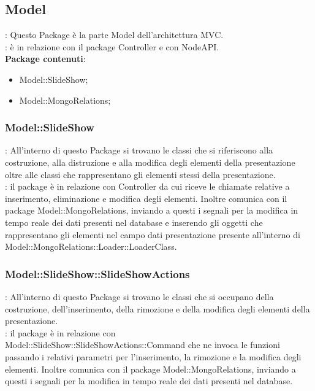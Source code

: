 \subsection{Model}{
	\textbf{\tipo}: Questo Package è la parte Model dell'architettura MVC.\\
	\textbf{\relaz}: è in relazione con il package Controller e con NodeAPI.\\
	\textbf{Package contenuti}: 
	\begin{itemize}
	\item Model::SlideShow;
    \item Model::MongoRelations;
	\end{itemize}
}
\subsubsection{Model::SlideShow}{
		\textbf{\tipo}: All’interno di questo Package si trovano le classi che si riferiscono alla costruzione, alla distruzione e alla modifica degli elementi della presentazione oltre alle classi che rappresentano gli elementi stessi della presentazione.\\
        \textbf{\relaz}: il package è in relazione con Controller da cui riceve le chiamate relative a inserimento, eliminazione e modifica degli elementi. Inoltre comunica con il package Model::MongoRelations, inviando a questi i segnali per la modifica in tempo reale dei dati presenti nel database e inserendo gli oggetti che rappresentano gli elementi nel campo dati presentazione presente all'interno di Model::MongoRelations::Loader::LoaderClass.\\
    }
\subsubsection{Model::SlideShow::SlideShowActions}{
		\textbf{\tipo}: All’interno di questo Package si trovano le classi che si occupano della costruzione, dell'inserimento, della rimozione e della modifica degli elementi della presentazione.\\
        \textbf{\relaz}: il package è in relazione con\\ Model::SlideShow::SlideShowActions::Command che ne invoca le funzioni passando i relativi parametri per l'inserimento, la rimozione e la modifica degli elementi. Inoltre comunica con il package Model::MongoRelations, inviando a questi i segnali per la modifica in tempo reale dei dati presenti nel database.\\
    }
    
